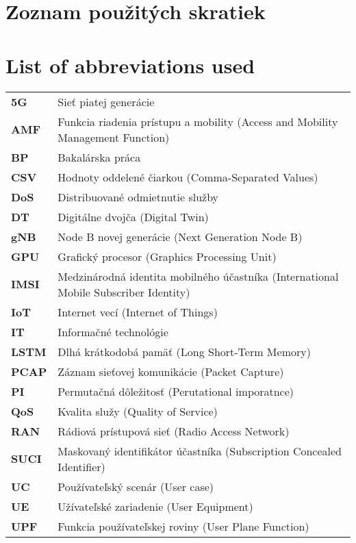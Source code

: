 \thispagestyle{plain}

\ifx\FIITlagEN\undefined
\section*{\Huge Zoznam použitých skratiek}
\else
\section*{\Huge List of abbreviations used}
\fi
\vskip 1cm

\begin{tabular}{ >{\bfseries}m{2cm} m{10cm} }
5G      &  Sieť piatej generácie \\
AMF     & Funkcia riadenia prístupu a mobility (Access and Mobility Management Function) \\  
BP      & Bakalárska práca \\  
CSV     & Hodnoty oddelené čiarkou (Comma-Separated Values) \\
DoS     & Distribuované odmietnutie služby \\
DT      & Digitálne dvojča (Digital Twin) \\  
gNB     & Node B novej generácie (Next Generation Node B) \\  
GPU     & Grafický procesor (Graphics Processing Unit) \\
IMSI    & Medzinárodná identita mobilného účastníka (International Mobile Subscriber Identity) \\
IoT     & Internet vecí (Internet of Things) \\  
IT      & Informačné technológie \\  
LSTM    & Dlhá krátkodobá pamäť (Long Short-Term Memory) \\
PCAP    & Záznam sieťovej komunikácie (Packet Capture) \\
PI      & Permutačná dôležitosť (Perutational imporatnce) \\
QoS     & Kvalita služy (Quality of Service) \\
RAN     & Rádiová prístupová sieť (Radio Access Network) \\  
SUCI    & Maskovaný identifikátor účastníka (Subscription Concealed Identifier) \\
UC      & Používateľský scenár (User case) \\
UE      & Užívateľské zariadenie (User Equipment) \\  
UPF     & Funkcia používateľskej roviny (User Plane Function) \\  
\end{tabular}

